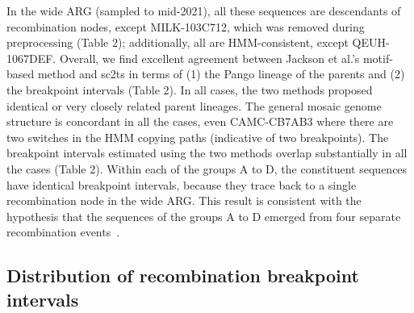 \documentclass{article}
\begin{document}

In the wide ARG (sampled to mid-2021), all these sequences are descendants of
recombination nodes, except MILK-103C712, which was removed during
preprocessing (Table 2); additionally, all are HMM-consistent, except
QEUH-1067DEF. Overall, we find excellent agreement between Jackson et al.’s
motif-based method and sc2ts in terms of (1) the Pango lineage of the parents
and (2) the breakpoint intervals (Table 2). In all cases, the two methods
proposed identical or very closely related parent lineages. The general mosaic
genome structure is concordant in all the cases, even CAMC-CB7AB3 where there
are two switches in the HMM copying paths (indicative of two breakpoints). The
breakpoint intervals estimated using the two methods overlap substantially in
all the cases (Table 2). Within each of the groups A to D, the constituent
sequences have identical breakpoint intervals, because they trace back to a
single recombination node in the wide ARG. This result is consistent with the
hypothesis that the sequences of the groups A to D emerged from four separate
recombination events~\cite{Jackson2021-ik}.

\subsection{Distribution of recombination breakpoint intervals}
\end{document}
